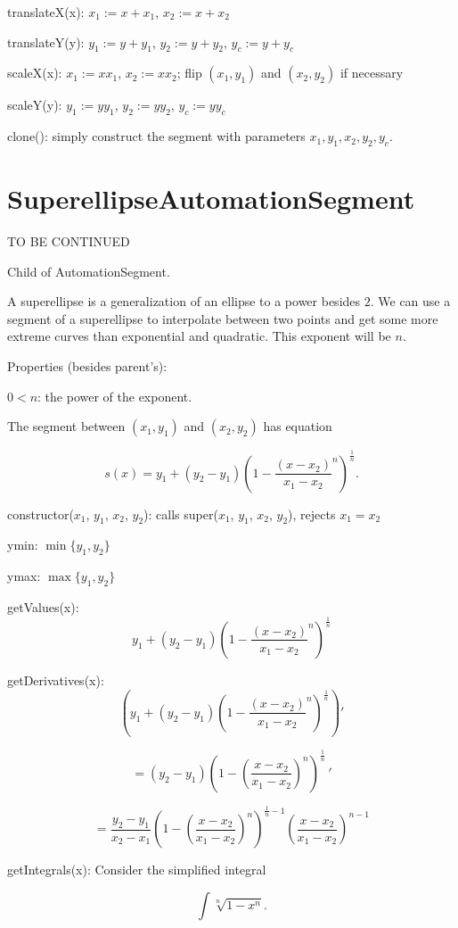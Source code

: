\documentclass{article}
\begin{document}
translateX(x): $x_1:=x+x_1$, $x_2:=x+x_2$

translateY(y): $y_1:=y+y_1$, $y_2:=y+y_2$, $y_c:=y+y_c$

scaleX(x): $x_1:=xx_1$, $x_2:=xx_2$; flip $(x_1, y_1)$ and $(x_2, y_2)$ if necessary

scaleY(y): $y_1:=yy_1$, $y_2:=yy_2$, $y_c:=yy_c$

clone(): simply construct the segment with parameters $x_1, y_1, x_2, y_2, y_c$.

\section{SuperellipseAutomationSegment}

TO BE CONTINUED

Child of AutomationSegment.

A superellipse is a generalization of an ellipse to a power besides $2$. We can use a segment of a superellipse to interpolate between two points and get some more extreme curves than exponential and quadratic. This exponent will be $n$.

Properties (besides parent's):

$0<n$: the power of the exponent.

The segment between $(x_1, y_1)$ and $(x_2, y_2)$ has equation

$$s(x)=y_1+\left(y_2-y_1\right)\left(1-\frac{\left(x-x_2\right)}{x_1-x_2}^n\right)^{\frac{1}{n}}.$$

constructor($x_1$, $y_1$, $x_2$, $y_2$): calls super($x_1$, $y_1$, $x_2$, $y_2$), rejects $x_1=x_2$

ymin: $\min\{y_1, y_2\}$

ymax: $\max\{y_1, y_2\}$

getValues(x): $$y_1+\left(y_2-y_1\right)\left(1-\frac{\left(x-x_2\right)}{x_1-x_2}^n\right)^{\frac{1}{n}}$$

getDerivatives(x): $$\left(y_1+\left(y_2-y_1\right)\left(1-\frac{\left(x-x_2\right)}{x_1-x_2}^n\right)^{\frac{1}{n}}\right)'$$

$$=\left(y_2-y_1\right)\left(1-\left(\frac{x-x_2}{x_1-x_2}\right)^n\right)^{\frac{1}{n}}\,'$$

$$=\frac{y_2-y_1}{x_2-x_1}\left(1-\left(\frac{x-x_2}{x_1-x_2}\right)^n\right)^{\frac{1}{n}-1}\left(\frac{x-x_2}{x_1-x_2}\right)^{n-1}$$

getIntegrals(x): Consider the simplified integral

$$\int \sqrt[n]{1-x^n}.$$
\end{document}
